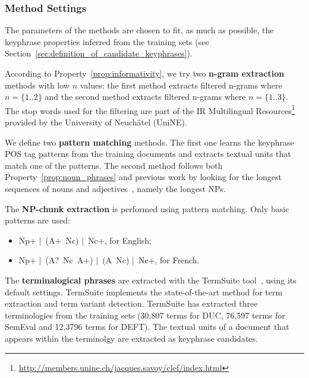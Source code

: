     \subsubsection{Method Settings}
    \label{subsubsec:method_settings}
      The parameters of the methods are chosen to fit, as much as possible, the
      keyphrase properties inferred from the training sets (see
      Section~\ref{sec:definition_of_candidate_keyphrases}).

      According to Property~\ref{prop:informativity}, we try two \textbf{n-gram
      extraction} methods with low $n$ values: the first method extracts
      filtered n-grams where $n = \{1..2\}$ and the second method extracts
      filtered n-grams where $n = \{1..3\}$. The stop words used for the
      filtering are part of the IR Multilingual
      Resources\footnote{\url{http://members.unine.ch/jacques.savoy/clef/index.html}}
      provided by the University of Neuchâtel (UniNE).

      We define two \textbf{pattern matching} methods. The first one learns the
      keyphrase POS tag patterns from the training documents and extracts
      textual units that match one of the patterns. The second method follows
      both Property~\ref{prop:noun_phrases} and previous work by looking for
      the longest sequences of nouns and
      adjectives~\cite{hassan2010conundrums}, namely the longest NPs.

      The \textbf{NP-chunk extraction} is performed using pattern matching. Only
      basic patterns are used:
      \begin{itemize}
        \item{Np+ $|$~(A+~Nc) $|$~Nc+, for English;}
        \item{Np+ $|$~(A?~Nc~A+) $|$~(A~Nc) $|$~Nc+, for French.}
      \end{itemize}


      The \textbf{terminalogical phrases} are extracted with the TermSuite
      tool~\cite{rocheteau2011termsuite}, using its default settings. TermSuite
      implements the state-of-the-art method for term extraction and term
      variant detection. TermSuite has extracted three terminologies from the
      training sets (30,807 terms for DUC, 76,597 terms for SemEval and 12,3796
      terms for DEFT). The textual units of a document that appears within the
      terminolgy are extracted as keyphrase candidates.

